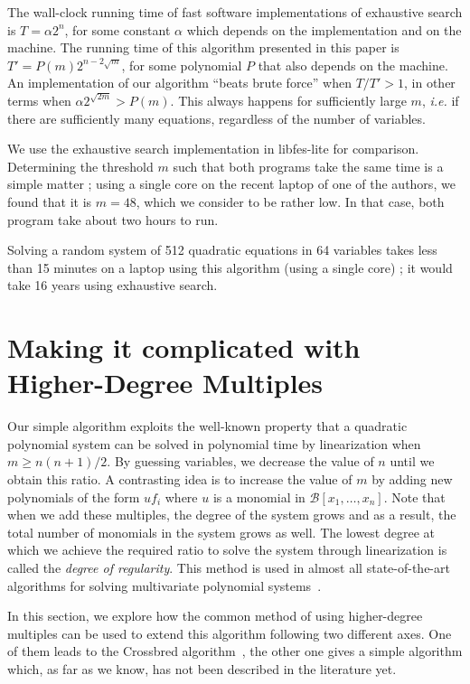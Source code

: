 \documentclass[a4paper,UKenglish,cleveref, autoref]{lipics-v2019}
\begin{document}
The wall-clock running time of fast software implementations of exhaustive
search is $T = \alpha 2^n$, for some constant $\alpha$ which depends on the
implementation and on the machine. The running time of this algorithm presented
in this paper is $T' = P(m) 2^{n - 2\sqrt{m}}$, for some polynomial $P$ that
also depends on the machine. An implementation of our algorithm ``beats brute
force'' when $T/T' > 1$, in other terms when
$\alpha 2^{\sqrt{2m}} > P(m)$. This always happens for sufficiently large
$m$, \textit{i.e.} if there are sufficiently many equations, regardless of the
number of variables.

We use the exhaustive search implementation in \textsf{libfes-lite} for
comparison. Determining the threshold $m$ such that both programs take the same
time is a simple matter ; using a single core on the recent laptop of one of the
authors, we found that it is $m=48$, which we consider to be rather low. In that
case, both program take about two hours to run.

Solving a random system of 512 quadratic equations in 64 variables takes less
than 15 minutes on a laptop using this algorithm (using a single core) ; it
would take 16 years using exhaustive search.


\section{Making it complicated with Higher-Degree Multiples}
\label{sec:extensions}


Our simple algorithm exploits the well-known property that a quadratic polynomial system can be solved in polynomial time by linearization when $m \geq n(n+1)/2$.
By guessing variables, we decrease the value of $n$ until we obtain this ratio. A contrasting idea is to increase the value of $m$ by adding new polynomials of the form $uf_i$ where $u$ is a monomial in $\mathcal{B}[x_1, \dots, x_n]$.
Note that when we add these multiples, the degree of the system grows and as a result, the total number of monomials in the system grows as well. The lowest degree at which we achieve the required ratio to solve the system through linearization is called the \textit{degree of regularity}. This method is used in almost all state-of-the-art algorithms for solving multivariate polynomial systems~\cite{F4,F5,CourtoisKPS00,BardetFSS13,JouxV17}. 

In this section, we explore how the common method of using higher-degree multiples can be used to extend this algorithm following two different axes.
%
One of them leads to the \textsf{Crossbred} algorithm~\cite{JouxV17}, the other
one gives a simple algorithm which, as far as we know, has not been described
in the literature yet.
\end{document}

